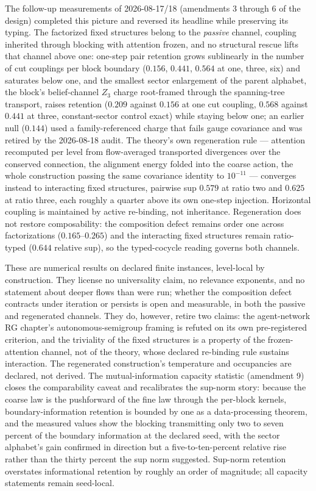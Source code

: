 \documentclass[11pt,letterpaper]{article}
\begin{document}
The follow-up measurements of 2026-08-17/18 (amendments 3 through 6 of the design) completed
this picture and reversed its headline while preserving its typing. The factorized fixed
structures belong to the \emph{passive} channel, coupling inherited through blocking with
attention frozen, and no structural rescue lifts that channel above one: one-step pair
retention grows sublinearly in the number of cut couplings per block boundary ($0.156$,
$0.441$, $0.564$ at one, three, six) and saturates below one, and the smallest sector
enlargement of the parent alphabet, the block's belief-channel $Z_3$ charge root-framed
through the spanning-tree transport, raises retention ($0.209$ against $0.156$ at one cut
coupling, $0.568$ against $0.441$ at three, constant-sector control exact) while staying
below one; an earlier null ($0.144$) used a family-referenced charge that fails gauge
covariance and was retired by the 2026-08-18 audit. The theory's own regeneration rule
— attention recomputed per level from flow-averaged transported divergences over the conserved
connection, the alignment energy folded into the coarse action, the whole construction passing
the same covariance identity to $10^{-11}$ — converges instead to interacting fixed
structures, pairwise sup $0.579$ at ratio two and $0.625$ at ratio three, each roughly a
quarter above its own one-step injection. Horizontal coupling is maintained by active
re-binding, not inheritance. Regeneration does not restore composability: the composition
defect remains order one across factorizations ($0.165$--$0.265$) and the interacting fixed
structures remain ratio-typed ($0.644$ relative sup), so the typed-cocycle reading governs
both channels.

\begin{boundarybox}
These are numerical results on declared finite instances, level-local by construction. They license no universality claim, no relevance exponents, and no statement about deeper flows than were run; whether the composition defect contracts under iteration or persists is open and measurable, in both the passive and regenerated channels. They do, however, retire two claims: the agent-network RG chapter's autonomous-semigroup framing is refuted on its own pre-registered criterion, and the triviality of the fixed structures is a property of the frozen-attention channel, not of the theory, whose declared re-binding rule sustains interaction. The regenerated construction's temperature and occupancies are declared, not derived. The mutual-information capacity statistic (amendment 9) closes the comparability caveat and recalibrates the sup-norm story: because the coarse law is the pushforward of the fine law through the per-block kernels, boundary-information retention is bounded by one as a data-processing theorem, and the measured values show the blocking transmitting only two to seven percent of the boundary information at the declared seed, with the sector alphabet's gain confirmed in direction but a five-to-ten-percent relative rise rather than the thirty percent the sup norm suggested. Sup-norm retention overstates informational retention by roughly an order of magnitude; all capacity statements remain seed-local.
\end{boundarybox}
\end{document}
